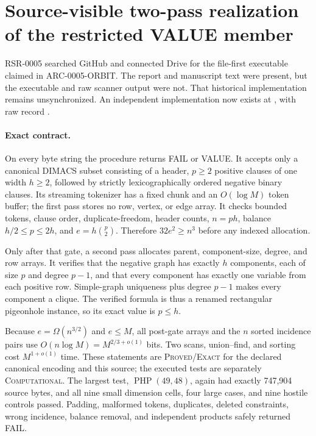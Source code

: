 \section{Source-visible two-pass realization of the restricted VALUE member}
RSR-0005 searched GitHub and connected Drive for the file-first executable
claimed in ARC-0005-ORBIT.  The report and manuscript text were present, but
the executable and raw scanner output were not.  That historical
implementation remains unsynchronized.  An independent implementation now
exists at
, with raw
record
.

\paragraph{Exact contract.}
On every byte string the procedure returns FAIL or VALUE.  It accepts only a
canonical DIMACS subset consisting of a header, $p\ge2$ positive clauses of
one width $h\ge2$, followed by strictly lexicographically ordered negative
binary clauses.  Its streaming tokenizer has a fixed chunk and an
$O(\log M)$ token buffer; the first pass stores no row, vertex, or edge array.
It checks bounded tokens, clause order, duplicate-freedom, header counts,
$n=ph$, balance $h/2\le p\le2h$, and $e=h\binom p2$.  Therefore
$32e^2\ge n^3$ before any indexed allocation.

Only after that gate, a second pass allocates parent, component-size, degree,
and row arrays.  It verifies that the negative graph has exactly $h$
components, each of size $p$ and degree $p-1$, and that every component has
exactly one variable from each positive row.  Simple-graph uniqueness plus
degree $p-1$ makes every component a clique.  The verified formula is thus a
renamed rectangular pigeonhole instance, so its exact value is $p\le h$.

Because $e=\Omega(n^{3/2})$ and $e\le M$, all post-gate arrays and the
$n$ sorted incidence pairs use $O(n\log M)=M^{2/3+o(1)}$ bits.  Two scans,
union--find, and sorting cost $M^{1+o(1)}$ time.  These statements are
\textsc{Proved/Exact} for the declared canonical encoding and this source;
the executed tests are separately \textsc{Computational}.  The largest test,
$\operatorname{PHP}(49,48)$, again had exactly 747,904 source bytes, and all
nine small dimension cells, four large cases, and nine hostile controls
passed.  Padding, malformed tokens, duplicates, deleted constraints, wrong
incidence, balance removal, and independent products safely returned FAIL.

